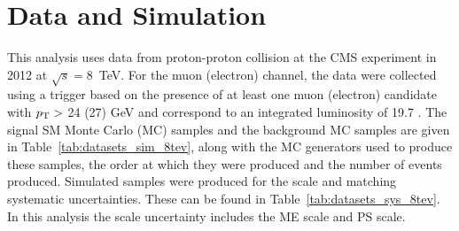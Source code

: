 


\section{Data and Simulation}
\label{sec:datasimulation}
This analysis uses data from proton-proton collision at the CMS experiment in 2012 at $\sqrt{s}=8$~TeV.
For the muon (electron) channel, the data were collected using a trigger based on the presence of at least one muon (electron) candidate with $p_{\mathrm{T}} > $ 24 (27) GeV and correspond to an integrated luminosity of 19.7 \fbinv .
The signal SM \tttt Monte Carlo (MC) samples and the background MC samples are given in Table~\ref{tab:datasets_sim_8tev}, along with the MC generators used to produce these samples, the order at which they were produced and the number of events produced. Simulated samples were produced for the scale and matching systematic uncertainties. These can be found in Table~\ref{tab:datasets_sys_8tev}. In this analysis the scale uncertainty includes the ME scale and PS scale.


